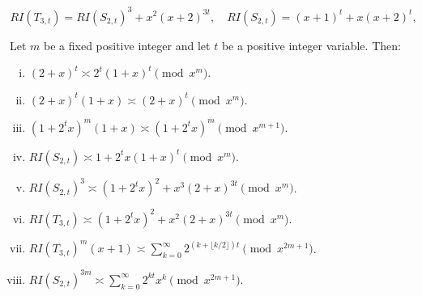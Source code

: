 \documentclass[10pt,a4paper]{amsart}
\newcommand{\floor}[1]{\lfloor #1\rfloor}
\begin{document}
\begin{equation}\label{eq:RTRS}
R I(T_{3,t}) =R I(S_{2,t})^3 + x^{2} (x+2)^{3t},\quad
R I(S_{2,t}) = (x+1)^t + x(x+2)^t,
\end{equation}

\begin{lemma}\label{l:comp}
Let $m$ be a fixed positive integer and let $t$ be a positive integer variable. Then:
\begin{enumerate}[(i)]
\item\label{l:i} $(2+x)^t\asymp2^t(1+x)^t\pmod{x^m}$.
\item\label{l:i1} $(2+x)^t(1+x)\asymp (2+x)^t\pmod{x^m}$.
  \item \label{l:i2} $(1+2^tx)^m(1+x)\asymp (1+2^tx)^m\pmod{x^{m+1}}$.
  \item\label{l:ii} $RI(S_{2,t})\asymp 1+2^tx(1+x)^t\pmod{x^m}$.
    \item\label{l:ii1} $RI(S_{2,t})^3\asymp (1+2^tx)^{2}+x^3(2+x)^{3t} \pmod{x^m}$.
\item\label{l:iv} $RI(T_{3,t})\asymp (1+2^tx)^{2}+x^{2}(2+x)^{3t}\pmod{x^m}$.
\item\label{l:v} $RI(T_{3,t})^{m}(x+1)\asymp \sum_{k=0}^{\infty} 2^{(k+\floor{k/2})t}\pmod{x^{2m+1}}$.
\item\label{l:vi} $RI(S_{2,t})^{3m}\asymp \sum_{k=0}^{\infty}2^{kt}x^k\pmod{x^{2m+1}}$.
\end{enumerate}
\end{lemma}
\end{document}
